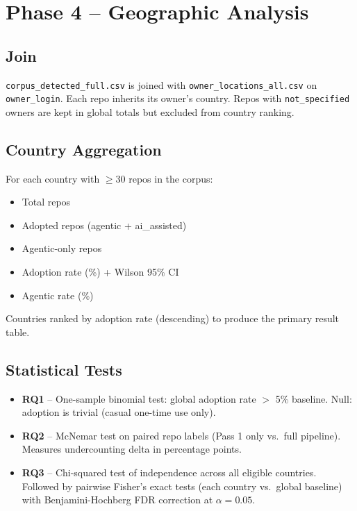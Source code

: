 \documentclass[12pt,a4paper]{article}
\begin{document}
\section{Phase 4 -- Geographic Analysis}

\subsection{Join}

\texttt{corpus\_detected\_full.csv} is joined with \texttt{owner\_locations\_all.csv}
on \texttt{owner\_login}. Each repo inherits its owner's country. Repos with
\texttt{not\_specified} owners are kept in global totals but excluded from country
ranking.

\subsection{Country Aggregation}

For each country with $\geq$30 repos in the corpus:

\begin{itemize}
  \item Total repos
  \item Adopted repos (agentic + ai\_assisted)
  \item Agentic-only repos
  \item Adoption rate (\%) + Wilson 95\% CI
  \item Agentic rate (\%)
\end{itemize}

Countries ranked by adoption rate (descending) to produce the primary result table.

\subsection{Statistical Tests}

\begin{itemize}
  \item \textbf{RQ1} -- One-sample binomial test: global adoption rate $>$ 5\% baseline.
        Null: adoption is trivial (casual one-time use only).

  \item \textbf{RQ2} -- McNemar test on paired repo labels (Pass 1 only vs.\ full
        pipeline). Measures undercounting delta in percentage points.

  \item \textbf{RQ3} -- Chi-squared test of independence across all eligible countries.
        Followed by pairwise Fisher's exact tests (each country vs.\ global baseline)
        with Benjamini-Hochberg FDR correction at $\alpha = 0.05$.
\end{itemize}
\end{document}
